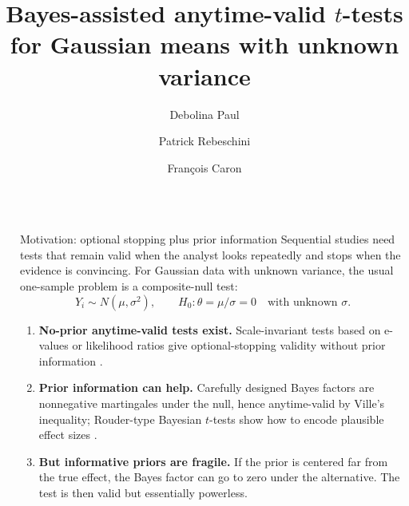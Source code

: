 \documentclass[final]{beamer}
\title{Bayes-assisted anytime-valid \texorpdfstring{$t$}{t}-tests for Gaussian means with unknown variance}
\author{Debolina Paul \and Patrick Rebeschini \and Fran\c{c}ois Caron}
\institute[shortinst]{Department of Statistics, University of Oxford}
\newlength{\sepwidth}
\newlength{\colwidth}
\newcommand{\separatorcolumn}{\begin{column}{\sepwidth}\end{column}}
\begin{document}
\begin{frame}[t]
\begin{columns}[t]
\separatorcolumn

\begin{column}{\colwidth}

\begin{block}{Motivation: optional stopping plus prior information}
    Sequential studies need tests that remain valid when the analyst looks repeatedly and stops when the evidence is convincing. For Gaussian data with unknown variance, the usual one-sample problem is a \alert{composite-null} test:
    \[
      Y_i\sim N(\mu,\sigma^2), \qquad H_0:\theta=\mu/\sigma=0
      \quad\text{with unknown }\sigma.
    \]

    \begin{enumerate}
      \setlength\itemsep{0.18cm}
      \item \textbf{No-prior anytime-valid tests exist.} Scale-invariant tests based on e-values or likelihood ratios give optional-stopping validity without prior information \citep{Lai1976, PerezOrtiz2024, Wang2025}.
      \item \textbf{Prior information can help.} Carefully designed Bayes factors are nonnegative martingales under the null, hence anytime-valid by Ville's inequality; Rouder-type Bayesian \(t\)-tests show how to encode plausible effect sizes \citep{Rouder2009}.
      \item \textbf{But informative priors are fragile.} If the prior is centered far from the true effect, the Bayes factor can go to zero under the alternative. The test is then valid but essentially powerless.
    \end{enumerate}

    \smallskipline
    \begin{center}
    \end{center}
  \end{block}


\end{column}
\end{columns}
\end{frame}
\end{document}
